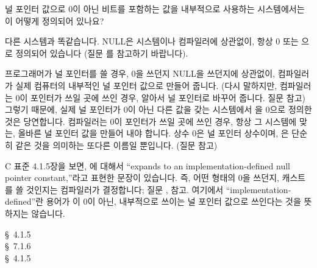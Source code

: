 \begin{faq}
	널 포인터 값으로 0이 아닌 비트를 포함하는 값을 내부적으로
	사용하는 시스템에서는
	이 어떻게 정의되어 있나요?

\A
	다른 시스템과 똑같습니다. NULL은 시스템이나 컴파일러에 상관없이,
        항상 0 또는 으로 정의되어 있습니다
	(질문 를 참고하기 바랍니다).

	프로그래머가 널 포인터를 쓸 경우, 0을 쓰던지 NULL을 쓰던지에
	상관없이, 컴파일러가 실제 컴퓨터의 내부적인 널 포인터 값으로 만들어
	줍니다. (다시 말하지만, 컴파일러는 0이 포인터가 쓰일 곳에 쓰인 경우,
	알아서 널 포인터로 바꾸어 줍니다. 질문  참고) 그렇기 때문에,
	실제 널 포인터가 0이 아닌 다른 값을 갖는 시스템에서 을
	0으로 정의한 것은 당연합니다. 컴파일러는 0이 포인터가 쓰일 곳에
	쓰인 경우, 항상 그 시스템에 맞는, 올바른 널 포인터 값을 만들어 내야
	합니다. 상수 0은 널 포인터 상수이며, 은 단순히 같은 것을
	의미하는 또다른 이름일 뿐입니다. (질문  참고)

	C 표준 4.1.5장을 보면, 에 대해서  ``expands to an 
	implementation-defined null pointer constant,''라고 표현한 문장이
	있습니다. 즉, 어떤 형태의 0을 쓰던지,  캐스트를 쓸 것인지는
	컴파일러가 결정합니다; 질문 ,  참고. 여기에서
	``implementation-defined''란 용어가 이 0이 아닌, 내부적으로
	쓰이는 널 포인터 값으로 쓰인다는 것을 뜻하지는 않습니다.

\R
	\cite{ansi} \S\ 4.1.5 \\
	\cite{c89} \S\ 7.1.6 \\
	\cite{rationale} \S\ 4.1.5
\end{faq}

